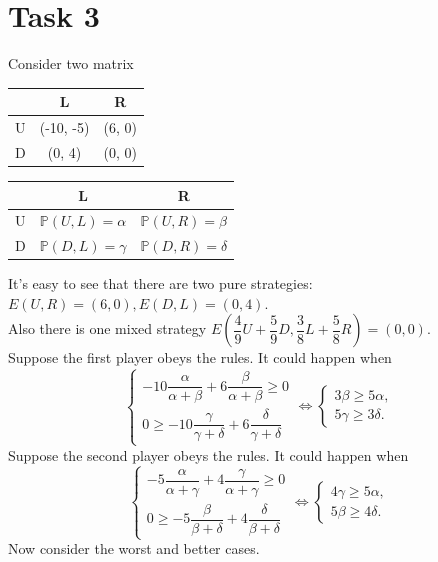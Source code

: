 \documentclass[a4paper, 12pt]{article}
\renewcommand*{\P}{\mathbb{P}}
\begin{document}
\section{Task 3}
Consider two matrix
\begin{center}
\begin{tabular}{|c|c|c|} 
\hline
& L & R\\ [0.5ex] 
\hline
U & (-10, -5) & (6, 0)\\ 
\hline
D & (0, 4) & (0, 0)\\ 
\hline
\end{tabular}
\begin{tabular}{|c|c|c|} 
\hline
& L & R\\[0.5ex]
\hline
U & $\P (U, L) = \alpha$ & $\P (U, R) = \beta$\\ 
\hline
D & $\P (D, L) = \gamma$ & $\P (D, R) = \delta$\\ 
\hline
\end{tabular}
\end{center}
It's easy to see that there are two pure strategies: $E(U, R) = (6, 0), E(D, L) = (0, 4).$\\
\noindent Also there is one mixed strategy $E \left( \dfrac{4}{9} U + \dfrac{5}{9} D, \dfrac{3}{8} L + \dfrac{5}{8} R \right) = (0, 0).$\\
\noindent Suppose the first player obeys the rules. It could happen when
$$
\begin{cases}
-10 \dfrac{\alpha}{\alpha + \beta} + 6 \dfrac{\beta}{\alpha + \beta} \geqslant 0 \\
0 \geqslant -10 \dfrac{\gamma}{\gamma + \delta} + 6 \dfrac{\delta}{\gamma + \delta}
\end{cases}
\Leftrightarrow
\begin{cases}
3 \beta \geqslant 5 \alpha, \\
5 \gamma \geqslant 3 \delta.
\end{cases}
$$
Suppose the second player obeys the rules. It could happen when
$$
\begin{cases}
-5 \dfrac{\alpha}{\alpha + \gamma} + 4 \dfrac{\gamma}{\alpha + \gamma} \geqslant 0 \\
0 \geqslant -5 \dfrac{\beta}{\beta + \delta} + 4 \dfrac{\delta}{\beta + \delta}
\end{cases}
\Leftrightarrow
\begin{cases}
4 \gamma \geqslant 5 \alpha, \\
5 \beta \geqslant 4 \delta.
\end{cases}
$$
Now consider the worst and better cases.
\end{document}
